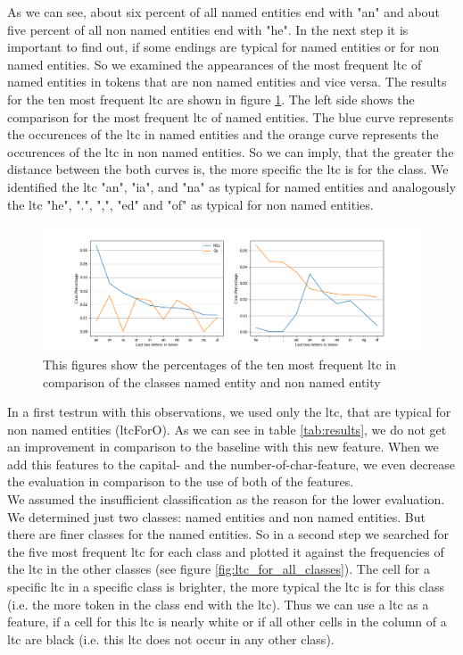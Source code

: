 \documentclass[noindent, nochapname]{tudexercise}
\begin{document}
			As we can see, about six percent of all named entities end with "an" and about five percent of all non named entities end with "he". In the next step it is important to find out, if some endings are typical for named entities or for non named entities. So we examined the appearances of the most frequent ltc of named entities in tokens that are non named entities and vice versa. The results for the ten most frequent ltc are shown in figure \ref{fig:ten_most_frequent_comparison}. The left side shows the comparison for the most frequent ltc of named entities. The blue curve represents the occurences of the ltc in named entities and the orange curve represents the occurences of the ltc in non named entities. So we can imply, that the greater the distance between the both curves is, the more specific the ltc is for the class. We identified the ltc "an", "ia", and "na" as typical for named entities and analogously the ltc "he", ".", ",", "ed" and "of" as typical for non named entities.\\
			
			\begin{figure}[h]
				\centering
				\includegraphics[scale=0.5]{img/last_two_letters_comparison.png}
				\caption{This figures show the percentages of the ten most frequent ltc in comparison of the classes named entity and non named entity}
				\label{fig:ten_most_frequent_comparison}
			\end{figure}
						
			In a first testrun with this observations, we used only the ltc, that are typical for non named entities (ltcForO). As we can see in table \ref{tab:results}, we do not get an improvement in comparison to the baseline with this new feature. When we add this features to the capital- and the number-of-char-feature, we even decrease the evaluation in comparison to the use of both of the features.\\
			
			We assumed the insufficient classification as the reason for the lower evaluation. We determined just two classes: named entities and non named entities. But there are finer classes for the named entities. So in a second step we searched for the five most frequent ltc for each class and plotted it against the frequencies of the ltc in the other classes (see figure \ref{fig:ltc_for_all_classes}). The cell for a specific ltc in a specific class is brighter, the more typical the ltc is for this class (i.e. the more token in the class end with the ltc). Thus we can use a ltc as a feature, if a cell for this ltc is nearly white or if all other cells in the column of a ltc are black (i.e. this ltc does not occur in any other class).
\end{document}
